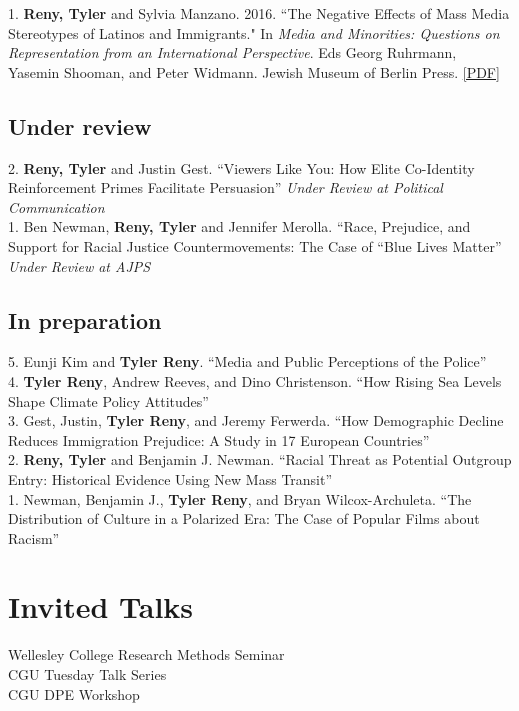 \documentclass[11pt, a4paper]{article}
\newcommand{\years}[1]{\marginnote{\scriptsize #1}}
\begin{document}
\years{2016} 1. \textbf{Reny, Tyler} and Sylvia Manzano. 2016. ``The Negative Effects of Mass Media Stereotypes of Latinos and Immigrants." In \textit{Media and Minorities: Questions on Representation from an International Perspective}. Eds Georg Ruhrmann, Yasemin Shooman, and Peter Widmann. Jewish Museum of Berlin Press. \href{http://tylerreny.github.io/pdf/pubs/reny_manzano_stereotypes_2016.pdf}{[PDF]}\\

\subsection*{Under review}

\years{} 2. \textbf{Reny, Tyler} and Justin Gest. ``Viewers Like You: How Elite Co-Identity Reinforcement Primes Facilitate Persuasion'' \textit{Under Review at Political Communication}\\
\years{} 1. Ben Newman, \textbf{Reny, Tyler} and Jennifer Merolla. ``Race, Prejudice, and Support for Racial Justice Countermovements: The Case of “Blue Lives Matter'' \textit{Under Review at AJPS}

\subsection*{In preparation}

\years{} 5. Eunji Kim and \textbf{Tyler Reny}. ``Media and Public Perceptions of the Police''\\
\years{} 4. \textbf{Tyler Reny}, Andrew Reeves, and Dino Christenson. ``How Rising Sea Levels Shape Climate Policy Attitudes''\\
\years{} 3. Gest, Justin, \textbf{Tyler Reny}, and Jeremy Ferwerda. ``How Demographic Decline Reduces Immigration Prejudice: A Study in 17 European Countries''\\
\years{} 2. \textbf{Reny, Tyler} and Benjamin J. Newman. ``Racial Threat as Potential Outgroup Entry: Historical Evidence Using New Mass Transit''\\
\years{} 1. Newman, Benjamin J., \textbf{Tyler Reny}, and Bryan Wilcox-Archuleta. ``The Distribution of Culture in a Polarized Era: The Case of Popular Films about Racism''\\

\section*{Invited Talks}

\years{2021} Wellesley College Research Methods Seminar\\
\years{} CGU Tuesday Talk Series\\
\years{} CGU DPE Workshop\\
\end{document}

